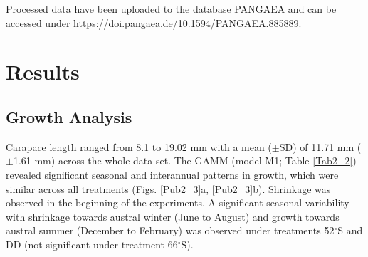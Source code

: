Processed data have been uploaded to the database PANGAEA and can be accessed
under \url{https://doi.pangaea.de/10.1594/PANGAEA.885889.}

\section{Results}

\subsection{Growth Analysis} 

Carapace length ranged from 8.1 to 19.02 mm with a mean ($\pm$SD) of 11.71 mm
($\pm$1.61 mm) across the whole data set. The GAMM (model M1; Table
\ref{Tab2_2}) revealed significant seasonal and interannual patterns in growth,
which were similar across all treatments (Figs. \ref{Pub2_3}a, \ref{Pub2_3}b).
Shrinkage was observed in the beginning of the experiments. A significant
seasonal variability with shrinkage towards austral winter (June to August) and
growth towards austral summer (December to February) was observed under
treatments 52$^{\circ}$S and DD (not significant under treatment
66$^{\circ}$S).

